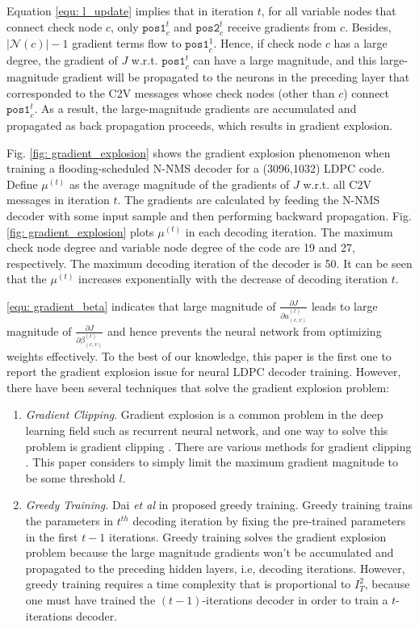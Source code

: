\documentclass [PhD] {uclathes}
\begin{document}
Equation \eqref{equ: l_update} implies that in iteration $t$, for all variable nodes that connect check node $c$, only $\texttt{pos1}_{c}^{t}$ and $\texttt{pos2}_{c}^{t}$ receive gradients from $c$. Besides, $|\mathcal{N}(c)|-1$ gradient terms flow to $\texttt{pos1}_{c}^1$. Hence, if check node  $c$ has a large degree, the gradient of $J$ w.r.t. $\texttt{pos1}_{c}^{t}$ can have a large magnitude, and this large-magnitude gradient will be propagated to the neurons in the preceding layer that corresponded to the C2V messages whose check nodes (other than $c$) connect $\texttt{pos1}_{c}^{t}$.  As a result, the large-magnitude gradients are accumulated and propagated as back propagation proceeds, which results in gradient explosion.

Fig. \ref{fig: gradient_explosion} shows the gradient explosion phenomenon when training a flooding-scheduled N-NMS decoder for a (3096,1032) LDPC code. Define $\mu^{(t)}$ as the average magnitude of the gradients of $J$ w.r.t. all C2V messages in iteration $t$. The gradients are calculated by feeding the  N-NMS decoder with some input sample and then performing backward propagation. Fig. \ref{fig: gradient_explosion} plots $\mu^{(t)}$ in each decoding iteration. The maximum check node degree and variable node degree of the code are 19 and 27, respectively. The maximum decoding iteration of the decoder is 50.  It can be seen that the $\mu^{(t)}$ increases exponentially with the decrease of decoding iteration $t$.

\eqref{equ: gradient_beta} indicates that  large magnitude of $\frac{\partial J}{\partial u^{(t)}_{(c,v)}}$ leads to large magnitude of $\frac{\partial J}{\partial \beta^{(t)}_{(c,v)}}$  and hence prevents the neural network from optimizing weights effectively. To the best of our knowledge, this paper is the first one to report the gradient explosion issue for neural LDPC decoder training. However, there have been several techniques that solve the gradient explosion problem:

\begin{enumerate} 
    \item \textit{Gradient Clipping}. Gradient explosion is a common problem in the deep learning field such as recurrent neural network, and one way to solve this problem is gradient clipping \cite{GoodBengCour16}.  There are various methods for gradient clipping \cite{mikolov2012, Pascanu2013-es}. This paper considers to  simply limit the maximum gradient magnitude to be some threshold $l$.
    
    \item \textit{Greedy Training}. Dai \textit{et al} in \cite{dai2021learning} proposed greedy training. Greedy training trains the parameters in $t^{th}$ decoding iteration by fixing the pre-trained parameters in the first $t-1$ iterations. Greedy training solves the gradient explosion problem because the large magnitude gradients won't be accumulated and propagated to the preceding hidden layers, i.e, decoding iterations. 
    However, greedy training requires a time complexity that is proportional to $I_T^2$, because one must have trained the $(t-1)$-iterations decoder in order to train
    a $t$-iterations decoder.
\end{enumerate}
\end{document}
